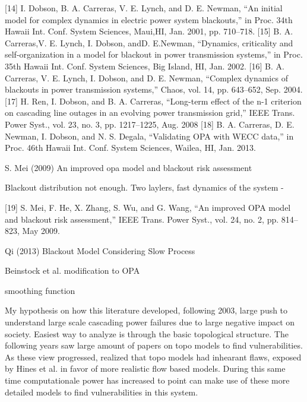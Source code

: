 [14] I. Dobson, B. A. Carreras, V. E. Lynch, and D. E. Newman, “An initial
model for complex dynamics in electric power system blackouts,” in
Proc. 34th Hawaii Int. Conf. System Sciences, Maui,HI, Jan. 2001, pp.
710–718.
[15] B. A. Carreras,V. E. Lynch, I. Dobson, andD. E.Newman, “Dynamics,
criticality and self-organization in a model for blackout in power transmission
systems,” in Proc. 35th Hawaii Int. Conf. System Sciences, Big
Island, HI, Jan. 2002.
[16] B. A. Carreras, V. E. Lynch, I. Dobson, and D. E. Newman, “Complex
dynamics of blackouts in power transmission systems,” Chaos, vol. 14,
pp. 643–652, Sep. 2004.
[17] H. Ren, I. Dobson, and B. A. Carreras, “Long-term effect of the n-1
criterion on cascading line outages in an evolving power transmission
grid,” IEEE Trans. Power Syst., vol. 23, no. 3, pp. 1217–1225, Aug.
2008
[18] B. A. Carreras, D. E. Newman, I. Dobson, and N. S. Degala, “Validating
OPA with WECC data,” in Proc. 46th Hawaii Int. Conf. System
Sciences, Wailea, HI, Jan. 2013.


S. Mei (2009)  An improved opa model and blackout risk assessment \cite{mei_2009}

Blackout distribution not enough.  
Two laylers, 
fast dynamics of the system - 

[19] S. Mei, F. He, X. Zhang, S. Wu, and G. Wang, “An improved OPA
model and blackout risk assessment,” IEEE Trans. Power Syst., vol.
24, no. 2, pp. 814–823, May 2009.

Qi (2013) Blackout Model Considering Slow Process  \cite{qi_2013}


Beinstock et al. modification to OPA

smoothing function





My hypothesis on how this literature developed, following 2003, large push to understand large scale cascading power failures due to large negative impact on society.  Easiest way to analyze is through the basic topological structure.  The following years saw large amount of papers on topo models to find vulnerabilities.  As these view progressed, realized that topo models had inhearant flaws, exposed by Hines et al. in favor of more realistic flow based models.  During this same time computationale power has increased to point can make use of these more detailed models to find vulnerabilities in this system.  

